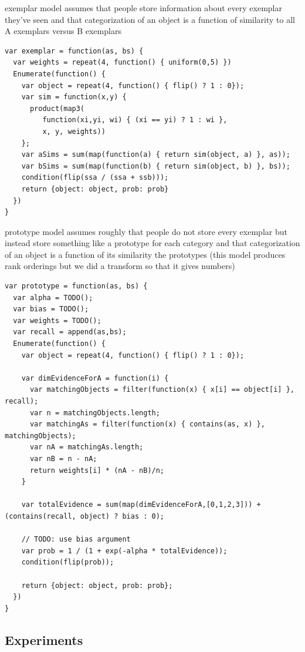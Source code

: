 \documentclass{article}
\newcommand{\cas}[1]{ \textsf{\color{darkgray} \scriptsize #1} }
\begin{document}
\cas{exemplar model assumes that people store information about every exemplar they've seen and that categorization of an object is a function of similarity to all A exemplars versus B exemplars}

\begin{lstlisting}[caption=Exemplar model (TODO: clearer input/output types)]
var exemplar = function(as, bs) {
  var weights = repeat(4, function() { uniform(0,5) })
  Enumerate(function() {
    var object = repeat(4, function() { flip() ? 1 : 0});
    var sim = function(x,y) {
      product(map3(
         function(xi,yi, wi) { (xi == yi) ? 1 : wi },
         x, y, weights))
    };
    var aSims = sum(map(function(a) { return sim(object, a) }, as));
    var bSims = sum(map(function(b) { return sim(object, b) }, bs));
    condition(flip(ssa / (ssa + ssb)));
    return {object: object, prob: prob}
  })
}
\end{lstlisting}

\cas{prototype model assumes roughly that people do not store every exemplar but instead store something like a prototype for each category and that categorization of an object is a function of its similarity the prototypes (this model produces rank orderings but we did a transform so that it gives numbers)}

\begin{lstlisting}[caption=Prototype model]
var prototype = function(as, bs) {
  var alpha = TODO();
  var bias = TODO();
  var weights = TODO();
  var recall = append(as,bs);
  Enumerate(function() {
    var object = repeat(4, function() { flip() ? 1 : 0});

    var dimEvidenceForA = function(i) {
      var matchingObjects = filter(function(x) { x[i] == object[i] }, recall);
      var n = matchingObjects.length;
      var matchingAs = filter(function(x) { contains(as, x) }, matchingObjects);
      var nA = matchingAs.length;
      var nB = n - nA;
      return weights[i] * (nA - nB)/n;
    }

    var totalEvidence = sum(map(dimEvidenceForA,[0,1,2,3])) + (contains(recall, object) ? bias : 0);

    // TODO: use bias argument
    var prob = 1 / (1 + exp(-alpha * totalEvidence));
    condition(flip(prob));

    return {object: object, prob: prob};
  })
}
\end{lstlisting}

\subsection{Experiments}
\end{document}
